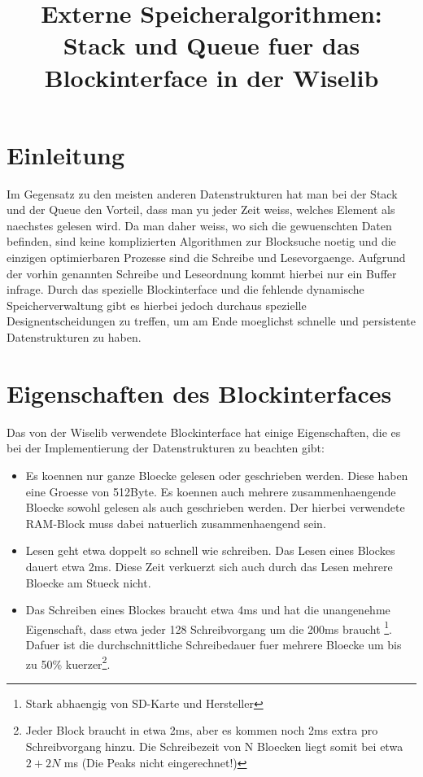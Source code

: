 \documentclass[10pt,a4paper]{article}
\begin{document}
\title{Externe Speicheralgorithmen: Stack und Queue fuer das Blockinterface in der Wiselib}
\section{Einleitung}
Im Gegensatz zu den meisten anderen Datenstrukturen hat man bei der Stack und der Queue den Vorteil, dass man yu jeder Zeit weiss, welches Element als naechstes gelesen wird. Da man daher weiss, wo sich die gewuenschten Daten befinden, sind keine komplizierten Algorithmen zur Blocksuche noetig und die einzigen optimierbaren Prozesse sind die Schreibe und Lesevorgaenge. Aufgrund der vorhin genannten Schreibe und Leseordnung kommt hierbei nur ein Buffer infrage. Durch das spezielle Blockinterface und die fehlende dynamische Speicherverwaltung gibt es hierbei jedoch durchaus spezielle Designentscheidungen zu treffen, um am Ende moeglichst schnelle und persistente Datenstrukturen zu haben.
\section{Eigenschaften des Blockinterfaces}
Das von der Wiselib verwendete Blockinterface hat einige Eigenschaften, die es bei der Implementierung der Datenstrukturen zu beachten gibt:
\begin{itemize}
\item Es koennen nur ganze Bloecke gelesen oder geschrieben werden. Diese haben eine Groesse von 512Byte. Es koennen auch mehrere zusammenhaengende Bloecke sowohl gelesen als auch geschrieben werden. Der hierbei verwendete RAM-Block muss dabei natuerlich zusammenhaengend sein.
\item Lesen geht etwa doppelt so schnell wie schreiben. Das Lesen eines Blockes dauert etwa 2ms. Diese Zeit verkuerzt sich auch durch das Lesen mehrere Bloecke am Stueck nicht.
\item Das Schreiben eines Blockes braucht etwa 4ms und hat die unangenehme Eigenschaft, dass etwa jeder 128 Schreibvorgang um die 200ms braucht \footnote{Stark abhaengig von SD-Karte und Hersteller}. Dafuer ist die durchschnittliche Schreibedauer fuer mehrere Bloecke um bis zu 50\% kuerzer\footnote{Jeder Block braucht in etwa 2ms, aber es kommen noch 2ms extra pro Schreibvorgang hinzu. Die Schreibezeit von N Bloecken liegt somit bei etwa $2+2N$ ms (Die Peaks nicht eingerechnet!)}.
\end{itemize} 
\end{document}

